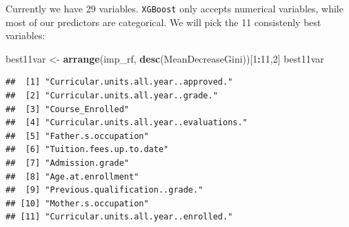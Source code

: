 \documentclass[
]{article}
\newenvironment{Shaded}{\begin{snugshade}}{\end{snugshade}}
\newcommand{\DecValTok}[1]{\textcolor[rgb]{0.00,0.00,0.81}{#1}}
\newcommand{\FunctionTok}[1]{\textcolor[rgb]{0.13,0.29,0.53}{\textbf{#1}}}
\newcommand{\NormalTok}[1]{#1}
\newcommand{\OtherTok}[1]{\textcolor[rgb]{0.56,0.35,0.01}{#1}}
\newcommand{\SpecialCharTok}[1]{\textcolor[rgb]{0.81,0.36,0.00}{\textbf{#1}}}
\begin{document}
Currently we have 29 variables. \texttt{XGBoost} only accepts numerical
variables, while most of our predictors are categorical. We will pick
the 11 consistenly best variables:

\begin{Shaded}
\begin{Highlighting}[]
\NormalTok{best11var }\OtherTok{\textless{}{-}} \FunctionTok{arrange}\NormalTok{(imp\_rf, }\FunctionTok{desc}\NormalTok{(MeanDecreaseGini))[}\DecValTok{1}\SpecialCharTok{:}\DecValTok{11}\NormalTok{,}\DecValTok{2}\NormalTok{]}
\NormalTok{best11var}
\end{Highlighting}
\end{Shaded}

\begin{verbatim}
##  [1] "Curricular.units.all.year..approved."   
##  [2] "Curricular.units.all.year..grade."      
##  [3] "Course_Enrolled"                        
##  [4] "Curricular.units.all.year..evaluations."
##  [5] "Father.s.occupation"                    
##  [6] "Tuition.fees.up.to.date"                
##  [7] "Admission.grade"                        
##  [8] "Age.at.enrollment"                      
##  [9] "Previous.qualification..grade."         
## [10] "Mother.s.occupation"                    
## [11] "Curricular.units.all.year..enrolled."
\end{verbatim}
\end{document}

